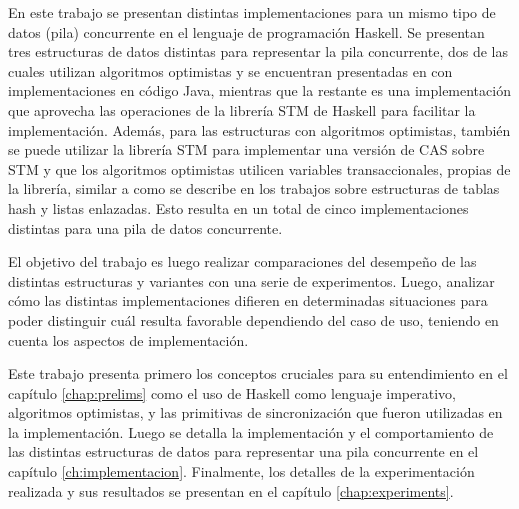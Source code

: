 En este trabajo se presentan distintas implementaciones para un mismo tipo de datos (pila) concurrente en el lenguaje de programación Haskell. Se presentan tres estructuras de datos distintas para representar la pila concurrente, dos de las cuales utilizan algoritmos optimistas y se encuentran presentadas en \cite{shavit} con implementaciones en código Java, mientras que la restante es una implementación que aprovecha las operaciones de la librería STM de Haskell para facilitar la implementación.
Además, para las estructuras con algoritmos optimistas, también se puede utilizar la librería STM para implementar una versión de CAS sobre STM y que los algoritmos optimistas utilicen variables transaccionales, propias de la librería, similar a como se describe en los trabajos \cite{hash} \cite{linked-list} sobre estructuras de tablas hash y listas enlazadas.
Esto resulta en un total de cinco implementaciones distintas para una pila de datos concurrente.

El objetivo del trabajo es luego realizar comparaciones del desempeño de las distintas estructuras y variantes con una serie de experimentos. Luego, analizar cómo las distintas implementaciones difieren en determinadas situaciones para poder distinguir cuál resulta favorable dependiendo del caso de uso, teniendo en cuenta los aspectos de implementación.

Este trabajo presenta primero los conceptos cruciales para su entendimiento en el capítulo \ref{chap:prelims} como el uso de Haskell como lenguaje imperativo, algoritmos optimistas, y las primitivas de sincronización que fueron utilizadas en la implementación.
Luego se detalla la implementación y el comportamiento de las distintas estructuras de datos para representar una pila concurrente en el capítulo \ref{ch:implementacion}. Finalmente, los detalles de la experimentación realizada y sus resultados se presentan en el capítulo \ref{chap:experiments}.